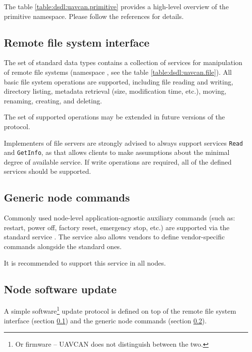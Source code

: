 The table \ref{table:dsdl:uavcan.primitive} provides a high-level overview of the primitive namespace.
Please follow the references for details.


\subsection{Remote file system interface}\label{sec:application_file_system}

The set of standard data types contains a collection of services for manipulation of remote file systems
(namespace , see the table \ref{table:dsdl:uavcan.file}).
All basic file system operations are supported, including file reading and writing,
directory listing, metadata retrieval (size, modification time, etc.), moving, renaming, creating, and deleting.

The set of supported operations may be extended in future versions of the protocol.

Implementers of file servers are strongly advised to always support services \verb|Read| and \verb|GetInfo|,
as that allows clients to make assumptions about the minimal degree of available service.
If write operations are required, all of the defined services should be supported.


\subsection{Generic node commands}\label{sec:application_generic_node_commands}

Commonly used node-level application-agnostic auxiliary commands
(such as: restart, power off, factory reset, emergency stop, etc.)
are supported via the standard service .
The service also allows vendors to define vendor-specific commands alongside the standard ones.

It is recommended to support this service in all nodes.

\subsection{Node software update}

A simple software\footnote{Or firmware -- UAVCAN does not distinguish between the two.}
update protocol is defined on top of the remote file system interface (section \ref{sec:application_file_system})
and the generic node commands (section \ref{sec:application_generic_node_commands}).

